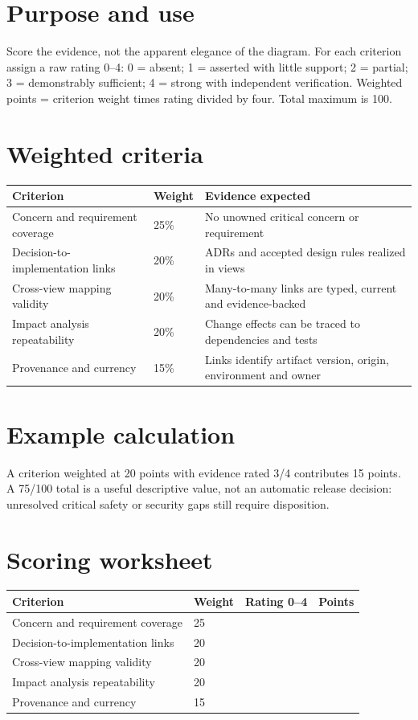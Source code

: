 \documentclass[10pt,letterpaper]{article}
\begin{document}
\DocProvenance
\section{Purpose and use}
Score the evidence, not the apparent elegance of the diagram. For each criterion assign a raw rating 0--4: 0 = absent; 1 = asserted with little support; 2 = partial; 3 = demonstrably sufficient; 4 = strong with independent verification. Weighted points = criterion weight times rating divided by four. Total maximum is 100.

\section{Weighted criteria}
\small
\begin{tabularx}{\linewidth}{@{}YYY@{}}
\toprule
\textbf{Criterion} & \textbf{Weight} & \textbf{Evidence expected} \\
\midrule
Concern and requirement coverage & 25\% & No unowned critical concern or requirement \\
Decision-to-implementation links & 20\% & ADRs and accepted design rules realized in views \\
Cross-view mapping validity & 20\% & Many-to-many links are typed, current and evidence-backed \\
Impact analysis repeatability & 20\% & Change effects can be traced to dependencies and tests \\
Provenance and currency & 15\% & Links identify artifact version, origin, environment and owner \\
\bottomrule
\end{tabularx}
\normalsize
\section{Example calculation}
A criterion weighted at 20 points with evidence rated 3/4 contributes 15 points. A 75/100 total is a useful descriptive value, not an automatic release decision: unresolved critical safety or security gaps still require disposition.

\section{Scoring worksheet}
\small
\begin{tabularx}{\linewidth}{@{}YYYY@{}}
\toprule
\textbf{Criterion} & \textbf{Weight} & \textbf{Rating 0--4} & \textbf{Points} \\
\midrule
Concern and requirement coverage & 25 &  &  \\
Decision-to-implementation links & 20 &  &  \\
Cross-view mapping validity & 20 &  &  \\
Impact analysis repeatability & 20 &  &  \\
Provenance and currency & 15 &  &  \\
\bottomrule
\end{tabularx}
\normalsize
\end{document}

